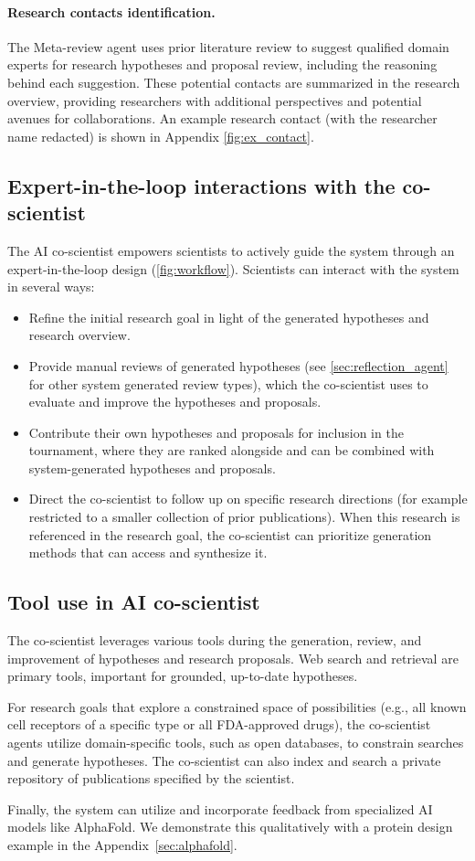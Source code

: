 \paragraph{Research contacts identification.}
The Meta-review agent uses prior literature review to suggest qualified domain experts for research hypotheses and proposal review, including the reasoning behind each suggestion. These potential contacts are summarized in the research overview, providing researchers with additional perspectives and potential avenues for collaborations. An example research contact (with the researcher name redacted) is shown in Appendix \cref{fig:ex_contact}.


\subsection{Expert-in-the-loop interactions with the co-scientist}
\label{sec:human_in_the_loop}
The AI co-scientist empowers scientists to actively guide the system through an expert-in-the-loop design (\cref{fig:workflow}). Scientists can interact with the system in several ways:
\begin{itemize}
    \item Refine the initial research goal in light of the generated hypotheses and research overview.
    \item Provide manual reviews of generated hypotheses (see \cref{sec:reflection_agent} for other system generated review types), which the co-scientist uses to evaluate and improve the hypotheses and proposals.
    \item Contribute their own hypotheses and proposals for inclusion in the tournament, where they are ranked alongside and can be combined with system-generated hypotheses and proposals.
    \item Direct the co-scientist to follow up on specific research directions (for example restricted to a smaller collection of prior publications). When this research is referenced in the research goal, the co-scientist can prioritize generation methods that can access and synthesize it.
\end{itemize}


\subsection{Tool use in AI co-scientist}
The co-scientist leverages various tools during the generation, review, and improvement of hypotheses and research proposals. Web search and retrieval are primary tools, important for grounded, up-to-date hypotheses.

For research goals that explore a constrained space of possibilities (e.g., all known cell receptors of a specific type or all FDA-approved drugs), the co-scientist agents utilize domain-specific tools, such as open databases, to constrain searches and generate hypotheses. The co-scientist can also index and search a private repository of publications specified by the scientist.

Finally, the system can utilize and incorporate feedback from specialized AI models like AlphaFold. We demonstrate this qualitatively with a protein design example in the Appendix~\cref{sec:alphafold}.